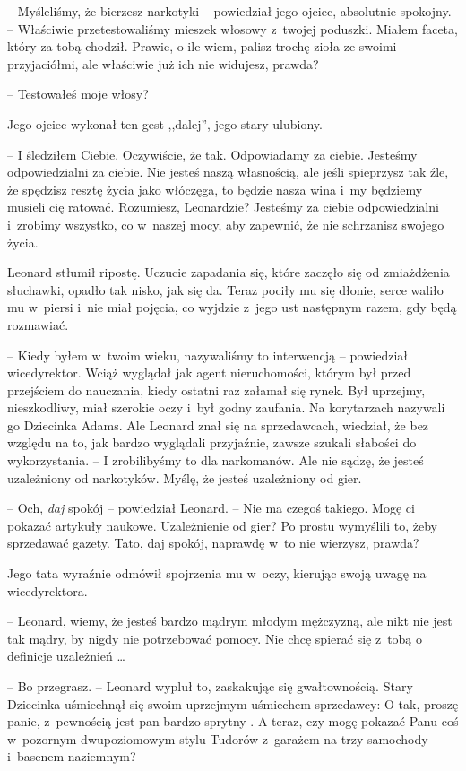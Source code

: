 \documentclass[oneside,polish,11pt,rmheadings]{mwbk}
\begin{document}
-- Myśleliśmy, że bierzesz narkotyki -- powiedział jego ojciec, absolutnie spokojny. -- Właściwie przetestowaliśmy mieszek włosowy z~twojej poduszki. Miałem faceta, który za tobą chodził. Prawie, o ile wiem, palisz trochę zioła ze swoimi przyjaciółmi, ale właściwie już ich nie widujesz, prawda? 


-- Testowałeś moje włosy? 


Jego ojciec wykonał ten gest ,,dalej'', jego stary ulubiony. 

-- I śledziłem Ciebie. Oczywiście, że tak. Odpowiadamy za ciebie. Jesteśmy odpowiedzialni za ciebie. Nie jesteś naszą własnością, ale jeśli spieprzysz tak źle, że spędzisz resztę życia jako włóczęga, to będzie nasza wina i~my będziemy musieli cię ratować. Rozumiesz, Leonardzie? Jesteśmy za ciebie odpowiedzialni i~zrobimy wszystko, co w~naszej mocy, aby zapewnić, że nie schrzanisz swojego życia.  


Leonard stłumił ripostę. Uczucie zapadania się, które zaczęło się od zmiażdżenia słuchawki, opadło tak nisko, jak się da. Teraz pociły mu się dłonie, serce waliło mu w~piersi i~nie miał pojęcia, co wyjdzie z~jego ust następnym razem, gdy będą rozmawiać. 


-- Kiedy byłem w~twoim wieku, nazywaliśmy to interwencją -- powiedział wicedyrektor. Wciąż wyglądał jak agent nieruchomości, którym był przed przejściem do nauczania, kiedy ostatni raz załamał się rynek. Był uprzejmy, nieszkodliwy, miał szerokie oczy i~był godny zaufania. Na korytarzach nazywali go Dziecinka Adams. Ale Leonard znał się na sprzedawcach, wiedział, że bez względu na to, jak bardzo wyglądali przyjaźnie, zawsze szukali słabości do wykorzystania. -- I zrobilibyśmy to dla narkomanów. Ale nie sądzę, że jesteś uzależniony od narkotyków. Myślę, że jesteś uzależniony od gier. 


-- Och, \textit{daj }spokój -- powiedział Leonard. -- Nie ma czegoś takiego. Mogę ci pokazać artykuły naukowe. Uzależnienie od gier? Po prostu wymyślili to, żeby sprzedawać gazety. Tato, daj spokój, naprawdę w~to nie wierzysz, prawda? 


Jego tata wyraźnie odmówił spojrzenia mu w~oczy, kierując swoją uwagę na wicedyrektora. 


-- Leonard, wiemy, że jesteś bardzo mądrym młodym mężczyzną, ale nikt nie jest tak mądry, by nigdy nie potrzebować pomocy. Nie chcę spierać się z~tobą o definicje uzależnień \ldots  


-- Bo przegrasz. -- Leonard wypluł to, zaskakując się gwałtownością. Stary Dziecinka uśmiechnął się swoim uprzejmym uśmiechem sprzedawcy: O tak, proszę panie, z~pewnością jest pan bardzo sprytny . A teraz, czy mogę pokazać Panu coś w~pozornym dwupoziomowym stylu Tudorów z~garażem na trzy samochody i~basenem naziemnym?
\end{document}
